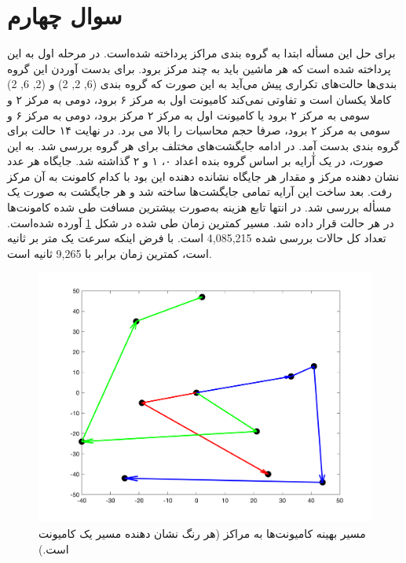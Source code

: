 \section{سوال چهارم}\label{Q4}
برای حل این مسأله ابتدا به گروه بندی مراکز پرداخته شده‌است. در مرحله اول به این پرداخته شده است که هر ماشین باید به چند مرکز برود. برای بدست آوردن این گروه بندی‌ها حالت‌های تکراری پیش می‌آید به این صورت که گروه بندی
(6, 2, 2)
و
(2, 6, 2)
کاملا یکسان است و تفاوتی نمی‌کند کامیونت اول به  مرکز ۶  برود، دومی به مرکز ۲  و سومی به مرکز ۲ برود یا کامیونت اول به مرکز ۲ مرکز برود، دومی به مرکز ۶ و سومی به مرکز ۲ برود، صرفا حجم محاسبات را بالا می برد. در نهایت ۱۴ حالت برای گروه بندی بدست آمد. در ادامه جایگشت‌های مختلف برای هر گروه بررسی شد. به این صورت، در یک آٰرایه بر اساس گروه بنده اعداد ۰، ۱ و ۲ گذاشته شد. جایگاه هر عدد نشان دهنده مرکز و مقدار هر جایگاه نشانده دهنده این بود با کدام کامونت به آن مرکز رفت. بعد ساخت این آرایه تمامی جایگشت‌ها ساخته شد و هر جایگشت به صورت یک مسأله 
بررسی شد. در انتها تابع هزینه به‌صورت بیشترین مسافت طی شده کامونت‌ها در هر حالت قرار داده شد. مسیر کمترین زمان طی شده در شکل
\ref{best_path_truck}
آورده شده‌است.
تعداد کل حالات بررسی شده
4,085,215
است. با فرض اینکه سرعت یک متر بر ثانیه است، کمترین زمان برابر با 9,265 ثانیه است.
 \begin{figure}[!h]
	\includegraphics[width=12cm]{../Figure/Q4/best_path.png}
	\centering
	\caption{مسیر بهینه کامیونت‌ها به مراکز (هر رنگ نشان دهنده مسیر یک کامیونت است.)}
	\label{best_path_truck}
\end{figure}